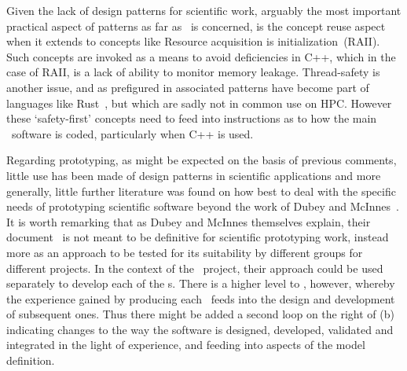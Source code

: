 Given the lack of design patterns for scientific work, arguably the most important practical aspect of
patterns as far as \nep\ is concerned, is the concept reuse aspect when
it extends to concepts like Resource acquisition is initialization~(RAII). Such concepts are invoked 
as a means to avoid deficiencies in C++, which in the case of RAII, is a lack of ability to monitor memory
leakage. Thread-safety is another issue, and as prefigured in  associated patterns have
become part of languages like Rust~\cite{Rustwebsite}, but which are sadly not in common use on HPC.
However these `safety-first' concepts need to feed into instructions as to how the main \nep\ software
is coded, particularly when C++ is used.

Regarding prototyping, as might be expected on the basis of previous comments, little use has been made of
design patterns in scientific applications and more generally, little further literature was found on how best to
deal with the specific needs of prototyping scientific software beyond the work of Dubey and McInnes~\cite{Du16Idea}.
It is worth remarking  that as Dubey and McInnes themselves explain, their document~\cite{Du16Idea}
is not meant to be definitive for scientific prototyping work, instead more as an approach to be tested for its 
suitability by different groups for different projects.  In the context of the
\nep\ project, their approach could be used separately to develop each of the \papp s. There is a higher
level to \nep, however, whereby the experience gained by producing each \papp\ feeds into the design
and development of subsequent ones. Thus there might be added a second loop on the right of (b) indicating
changes to the way the software is designed, developed, validated and integrated in the light of experience,
and feeding into aspects of the model definition.
